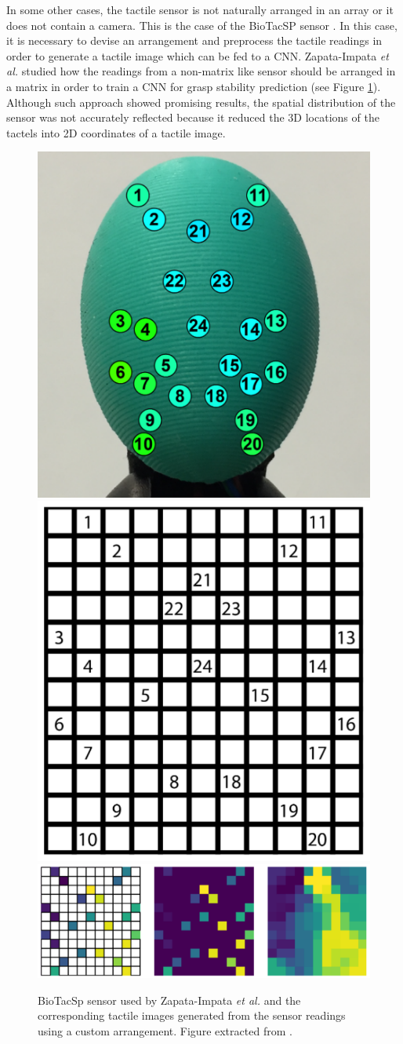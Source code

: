 In some other cases, the tactile sensor is not naturally arranged in an array or it does not contain a camera. This is the case of the BioTacSP sensor \cite{Syntouch2018}. In this case, it is necessary to devise an arrangement and preprocess the tactile readings in order to generate a tactile image which can be fed to a \ac{CNN}. Zapata-Impata \emph{et al.} \cite{Zapata2018} studied how the readings from a non-matrix like sensor should be arranged in a matrix in order to train a \ac{CNN} for grasp stability prediction (see Figure \ref{fig:tactile:impata2018}). Although such approach showed promising results, the spatial distribution of the sensor was not accurately reflected because it reduced the \acs{3D} locations of the tactels into \acs{2D} coordinates of a tactile image.

\begin{figure}[!htb]
    \centering
    \includegraphics[width=0.3\linewidth]{Figures/Tactile/tactilebrayan1.png}
    \includegraphics[width=0.3\linewidth]{Figures/Tactile/tactilebrayan2.png}
    \includegraphics[width=0.7\linewidth]{Figures/Tactile/tactilebrayan3.png}
    \caption{BioTacSp sensor used by Zapata-Impata \emph{et al.} and the corresponding tactile images generated from the sensor readings using a custom arrangement. Figure extracted from \cite{Zapata2018}.}
    \label{fig:tactile:impata2018}
\end{figure}

